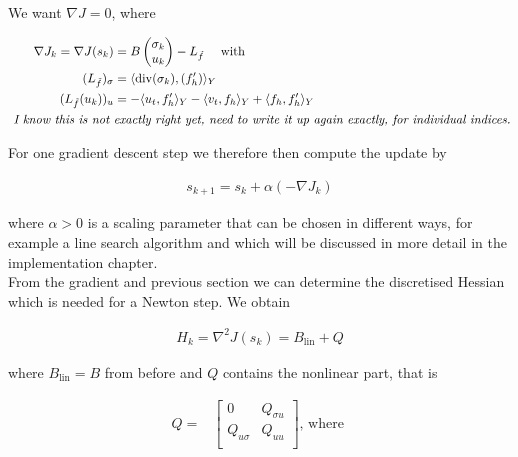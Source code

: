 \documentclass[../draft_1.tex]{subfiles}
\begin{document}
We want $\nabla J = 0$, where

\begin{ceqn}
	\begin{align}
		\nabla J_k = \nabla J(s_k) &= B \begin{pmatrix}
	\sigma_k \\
	u_k
	\end{pmatrix} - L_{\tilde{f}} \quad \text{ with } \\
 (L_{\tilde{f}})_{\sigma} &= \langle \mathop{}\!\mathrm{div}(\sigma_k), (f'_h) \rangle_Y \\
  (L_{\tilde{f}}(u_k))_{u} &= - \langle u_t, f'_h \rangle_Y - \langle v_t, f_h \rangle_Y  + \langle f_h, f'_h \rangle_Y \\
  \textit{ I know this is not }& \textit{exactly right yet, need to write it up again exactly, for individual indices.}
	\end{align}
\end{ceqn}
For one gradient descent step we therefore then compute the update by 
\begin{ceqn}
	\begin{align}
s_{k+1} = s_k + \alpha (-\nabla J_k)
	\end{align}
\end{ceqn}
where $\alpha > 0$ is a scaling parameter that can be chosen in different ways, for example a line search algorithm and which will be discussed in more detail in the implementation chapter. 
\smallskip
\\
From the gradient and previous section we can determine the discretised Hessian which is needed for a Newton step. We obtain 
\begin{ceqn}
	\begin{align}
	H_k = \nabla^2 J(s_k) = B_{\text{lin}} + Q
	\end{align}
\end{ceqn}
where $B_{\text{lin}} = B$ from before and $Q$ contains the nonlinear part, that is
\begin{ceqn}
	\begin{align}
	Q =& 
	\begin{bmatrix}
	0 &  Q_{\sigma u}  \\
	 Q_{u \sigma}  &    Q_{uu} \\
	\end{bmatrix}  \text{, where } \\
		\end{align}
\end{ceqn}
\end{document}
